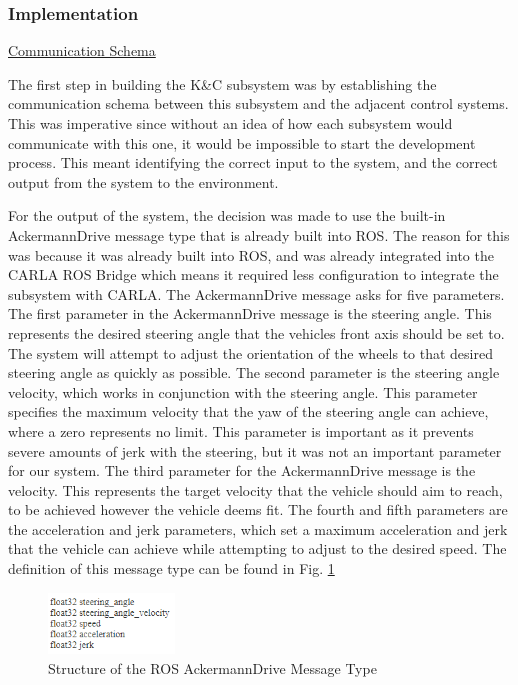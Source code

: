 \documentclass[titlepage,draft]{article}
\begin{document}
{\subsubsection{Implementation}
\underline{Communication Schema}

The first step in building the K\&C subsystem was by establishing the communication schema between this subsystem and the adjacent control systems. This was imperative since without an idea of how each subsystem would communicate with this one, it would be impossible to start the development process. This meant identifying the correct input to the system, and the correct output from the system to the environment.

For the output of the system, the decision was made to use the built-in AckermannDrive message type that is already built into ROS. The reason for this was because it was already built into ROS, and was already integrated into the CARLA ROS Bridge which means it required less configuration to integrate the subsystem with CARLA. The AckermannDrive message asks for five parameters. The first parameter in the AckermannDrive message is the steering angle. This represents the desired steering angle that the vehicles front axis should be set to. The system will attempt to adjust the orientation of the wheels to that desired steering angle as quickly as possible. The second parameter is the steering angle velocity, which works in conjunction with the steering angle. This parameter specifies the maximum velocity that the yaw of the steering angle can achieve, where a zero represents no limit. This parameter is important as it prevents severe amounts of jerk with the steering, but it was not an important parameter for our system. The third parameter for the AckermannDrive message is the velocity. This represents the target velocity that the vehicle should aim to reach, to be achieved however the vehicle deems fit. The fourth and fifth parameters are the acceleration and jerk parameters, which set a maximum acceleration and jerk that the vehicle can achieve while attempting to adjust to the desired speed. The definition of this message type can be found in Fig. \ref{fig:ackermann}

\begin{figure}
	\centering
	\includegraphics[width=0.3\textwidth]{ackeramnn_drive}
	\caption{Structure of the ROS AckermannDrive Message Type}
	\label{fig:ackermann}
\end{figure}

}
\end{document}
